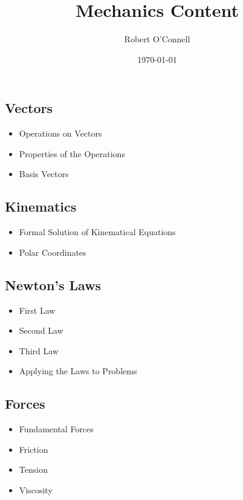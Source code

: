 \documentclass{article}
\title{\textbf{Mechanics Content}}
\author{Robert O'Connell}
\date{\today}
\begin{document}
\maketitle
\vspace{5mm}
\subsection*{Vectors}
\begin{itemize}
    \item Operations on Vectors
    \item Properties of the Operations
    \item Basis Vectors
\end{itemize}

\subsection*{Kinematics}
\begin{itemize}
    \item Formal Solution of Kinematical Equations
    \item Polar Coordinates
\end{itemize}

\subsection*{Newton's Laws}
\begin{itemize}
    \item First Law
    \item Second Law
    \item Third Law
    \item Applying the Laws to Problems
\end{itemize}

\subsection*{Forces}
\begin{itemize}
    \item Fundamental Forces 
    \item Friction
    \item Tension
    \item Viscosity
\end{itemize}
\end{document}
